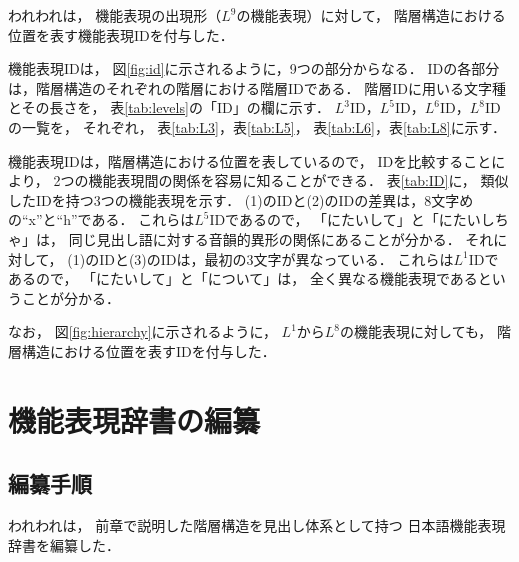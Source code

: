 \documentclass[japanese]{jnlp_1.3e}
\begin{document}
われわれは，
機能表現の出現形（$L^9$の機能表現）に対して，
階層構造における位置を表す機能表現IDを付与した．

機能表現IDは，
図\ref{fig:id}に示されるように，9つの部分からなる．
IDの各部分は，階層構造のそれぞれの階層における階層IDである．
階層IDに用いる文字種とその長さを，
表\ref{tab:levels}の「ID」の欄に示す．
$L^3$ID，$L^5$ID，$L^6$ID，$L^8$IDの一覧を，
それぞれ，
表\ref{tab:L3}，表\ref{tab:L5}，
表\ref{tab:L6}，表\ref{tab:L8}に示す．
\begin{figure}[b]

\end{figure}

\begin{table}[b]

\end{table}

\begin{table}[t]
\begin{minipage}[t]{0.5\textwidth}

\end{minipage}
\hfill
\begin{minipage}[t]{0.4\textwidth}

\vspace{1\baselineskip}

\end{minipage}
\end{table}


機能表現IDは，階層構造における位置を表しているので，
IDを比較することにより，
2つの機能表現間の関係を容易に知ることができる．
表\ref{tab:ID}に，
類似したIDを持つ3つの機能表現を示す．
(1)のIDと(2)のIDの差異は，8文字めの``x''と``h''である．
これらは$L^5$IDであるので，
「にたいして」と「にたいしちゃ」は，
同じ見出し語に対する音韻的異形の関係にあることが分かる．
それに対して，
(1)のIDと(3)のIDは，最初の3文字が異なっている．
これらは$L^1$IDであるので，
「にたいして」と「について」は，
全く異なる機能表現であるということが分かる．

なお，
図\ref{fig:hierarchy}に示されるように，
$L^1$から$L^8$の機能表現に対しても，
階層構造における位置を表すIDを付与した．




\section{機能表現辞書の編纂}

\subsection{編纂手順}

われわれは，
前章で説明した階層構造を見出し体系として持つ
日本語機能表現辞書を編纂した．
\end{document}

